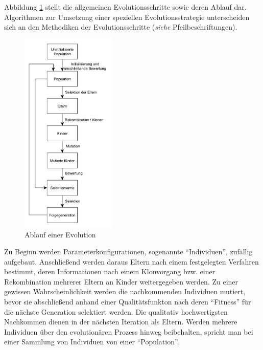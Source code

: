 Abbildung \ref{fig:ablauf_einer_evolution} stellt die allgemeinen Evolutionsschritte sowie deren Ablauf dar.
Algorithmen zur Umsetzung einer speziellen Evolutionsstrategie unterscheiden sich an den Methodiken der Evolutionsschritte (\textit{siehe} Pfeilbeschriftungen).

\begin{figure}[H]
\centering
\includegraphics[width=0.4\textwidth]{img/ablauf_einer_evolution.pdf}
\caption[Ablauf einer Evolution]{Ablauf einer Evolution\protect\footnotemark}
\label{fig:ablauf_einer_evolution}
\end{figure}

Zu Beginn werden Parameterkonfigurationen, sogenannte \enquote{Individuen}, zufällig aufgebaut.
Anschließend werden daraus Eltern nach einem festgelegten Verfahren bestimmt, deren Informationen nach einem Klonvorgang bzw. einer Rekombination mehrerer Eltern an Kinder weitergegeben werden.
Zu einer gewissen Wahrscheinlichkeit werden die nachkommenden Individuen mutiert, bevor sie abschließend anhand einer Qualitätsfunkton nach deren \enquote{Fitness} für die nächste Generation selektiert werden.
Die qualitativ hochwertigsten Nachkommen dienen in der nächsten Iteration als Eltern.
Werden mehrere Individuen über den evolutionären Prozess hinweg beibehalten, spricht man bei einer Sammlung von Individuen von einer \enquote{Population}.

